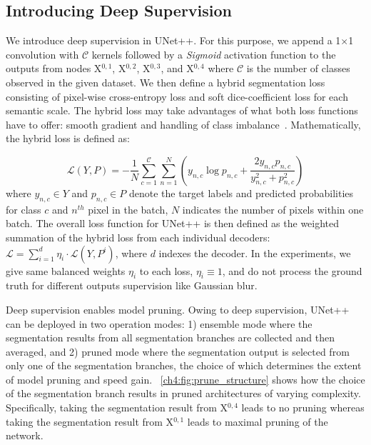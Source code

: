 \subsection{Introducing Deep Supervision}
We introduce deep supervision in UNet++. For this purpose, we append a 1$\times$1 convolution with $\mathcal{C}$ kernels followed by a \textit{Sigmoid} activation function to the outputs from nodes  X$^{0,1}$, X$^{0,2}$, X$^{0,3}$, and X$^{0,4}$ where $\mathcal{C}$ is the number of classes observed in the given dataset. We then define a hybrid segmentation loss consisting of pixel-wise cross-entropy loss and soft dice-coefficient loss for each semantic scale. The hybrid loss may take advantages of what both loss functions have to offer: smooth gradient and handling of class imbalance~\citep{milletari2016v,sudre2017generalised}. Mathematically, the hybrid loss is defined as: 

\begin{equation}
\label{eq:object_function}
\mathcal{L}(Y,P) = -\frac{1}{N}\sum_{c=1}^{\mathcal{C}}\sum_{n=1}^{N}{\left(y_{n,c}\log{p_{n,c}}+\frac{2y_{n,c}p_{n,c}}{y^2_{n,c}+p^2_{n,c}}\right)}
\end{equation}
\noindent where $y_{n,c}\in Y$ and $p_{n,c}\in P$ denote the target labels and predicted probabilities for class $c$ and $n^{th}$ pixel in the batch, $N$ indicates the number of pixels within one batch. The overall loss function for UNet++ is then defined as the weighted summation of the hybrid loss from each individual decoders: $\mathcal{L}=\sum_{i=1}^{d}{\eta_i\cdot \mathcal{L}(Y,P^i)}$, where $d$ indexes the decoder. In the experiments, we give same balanced weights $\eta_i$ to each loss, \ie $\eta_i\equiv 1$, and do not process the ground truth for different outputs supervision like Gaussian blur.

Deep supervision enables model pruning. Owing to deep supervision, UNet++ can be deployed in two operation modes: 1) ensemble mode where the segmentation results from all segmentation branches are collected and then averaged, and 2) pruned mode where the segmentation output is selected from only one of the segmentation branches, the choice of which determines the extent of model pruning and speed gain.  \figurename~\ref{ch4:fig:prune_structure} shows how the choice of the segmentation branch results in pruned architectures of varying complexity. Specifically, taking the segmentation result from X$^{0,4}$ leads to no pruning whereas taking the segmentation result from X$^{0,1}$ leads to maximal pruning of the network.


